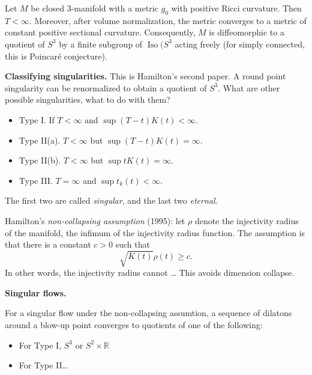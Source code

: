 \begin{theorem}[Hamilton, 1982]
\label{theorem-hamilton82-2}
Let $M$ be closed 3-manifold with a metric
$g_0$ with positive Ricci curvature.
Then $T< \infty$.
Moreover, after volume normalization,
the metric converges to a metric
of constant positive sectional
curvature.
Consequently, $M$ is diffeomorphic to a
quotient of $S^3$ by a finite subgroup
of $\operatorname{Iso}(S^3$ acting freely
(for simply connected, this is Poincaré
conjecture).
\end{theorem}

\medskip\noindent
{\bf Classifying singularities.}
This is Hamilton's second paper.
A round point singularity can be
renormalized to obtain a quotient of $S^3$.
What are other possible singularities, what
to do with them?

\begin{definition}[Hamilton, 1995]
\label{definition-hamilton95}
\begin{itemize}
\item Type I. If $T< \infty$ and
$\operatorname{sup}(T-t)K(t)<\infty$.
\item Type II(a). $T<\infty$ but
$\operatorname{sup}(T-t)K(t)=\infty$.
\item Type II(b). $T<\infty$ but
$\operatorname{sup}tK(t)=\infty$.
\item Type III. $T=\infty$ and
$\operatorname{sup} t_k(t)<\infty$.
\end{itemize}
\noindent
The first two are called {\it singular},
and the last two {\it eternal}.
\end{definition}

\noindent
Hamilton's {\it non-collapsing assumption} 
(1995): let $\rho$ denote the injectivity
radius of the manifold, the infimum
of the injectivity radius function.
The assumption is that there is a constant
$c>0$ such that
$$
\sqrt{K(t)}\rho(t) \geq c.
$$
In other words, the injectivity radius
cannot … This avoids dimension collapse.

\medskip\noindent
{\bf Singular flows.}
\begin{theorem}[Hamilton 1995]
\label{theorem-hamilton95}
For a singular flow under the non-collapsing
assumtion, a sequence of dilatons around a
blow-up point converges to quotients
of one of the following:
\begin{itemize}
\item  For Type I, $S^3$ or $S^2 \times \mathbb{R}$
\item For Type II…
\end{itemize}
\end{theorem}

